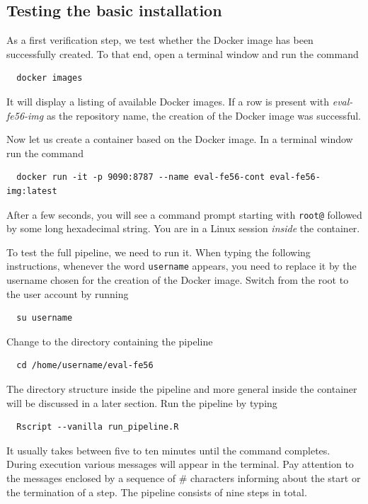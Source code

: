 \documentclass[12pt,a4paper]{scrartcl}
\begin{document}
 \subsection{Testing the basic installation}
 \label{subsec:test_basic_install}
 As a first verification step, we test whether the Docker image has been successfully created.
 To that end, open a terminal window and run the command
\begin{verbatim}
  docker images
\end{verbatim}
 It will display a listing of available Docker images.
 If a row is present with \textit{eval-fe56-img} as the repository name, the creation of the Docker image was successful.
 
 Now let us create a container based on the Docker image.
 In a terminal window run the command
\begin{verbatim}
  docker run -it -p 9090:8787 --name eval-fe56-cont eval-fe56-img:latest\end{verbatim}
 After a few seconds, you will see a command prompt starting with \verb#root@# followed by some long hexadecimal string.
 You are in a Linux session \textit{inside} the container.
 
 To test the full pipeline, we need to run it.
 When typing the following instructions, whenever the word \verb#username# appears, you need to replace it by the username chosen for the creation of the Docker image.
 Switch from the root to the user account by running
\begin{verbatim}
  su username
\end{verbatim} 
 Change to the directory containing the pipeline
\begin{verbatim}
  cd /home/username/eval-fe56
\end{verbatim}
  The directory structure inside the pipeline and more general inside the container will be discussed in a later section.
  Run the pipeline by typing
\begin{verbatim}
  Rscript --vanilla run_pipeline.R
\end{verbatim}
It usually takes between five to ten minutes until the command completes.
During execution various messages will appear in the terminal.
Pay attention to the messages enclosed by a sequence of \# characters informing about the start or the termination of a step.
The pipeline consists of nine steps in total.
\end{document}
